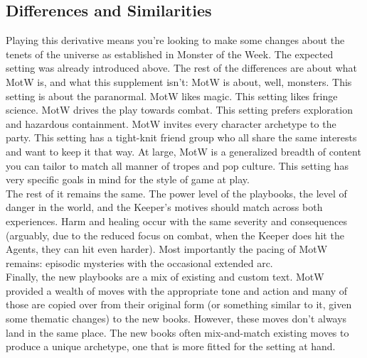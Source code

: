 \documentclass[12pt,oneside,landscape]{memoir}
\begin{document}
\begin{multicols}{2}
\section*{Differences and Similarities}
Playing this derivative means you’re looking to make some changes about the tenets of the universe as established in Monster of the Week.  The expected setting was already introduced above.  The rest of the differences are about what MotW is, and what this supplement isn’t:  MotW is about, well, monsters.  This setting is about the paranormal.  MotW likes magic.  This setting likes fringe science.  MotW drives the play towards combat.  This setting prefers exploration and hazardous containment.  MotW invites every character archetype to the party.  This setting has a tight-knit friend group who all share the same interests and want to keep it that way.  At large, MotW is a generalized breadth of content you can tailor to match all manner of tropes and pop culture.  This setting has very specific goals in mind for the style of game at play.
\\[4mm]
The rest of it remains the same.  The power level of the playbooks, the level of danger in the world, and the Keeper’s motives should match across both experiences.  Harm and healing occur with the same severity and consequences (arguably, due to the reduced focus on combat, when the Keeper does hit the Agents, they can hit even harder).  Most importantly the pacing of MotW remains: episodic mysteries with the occasional extended arc.
\\[4mm]
Finally, the new playbooks are a mix of existing and custom text.  MotW provided a wealth of moves with the appropriate tone and action and many of those are copied over from their original form (or something similar to it, given some thematic changes) to the new books.  However, these moves don’t always land in the same place.  The new books often mix-and-match existing moves to produce a unique archetype, one that is more fitted for the setting at hand.


\end{multicols}
\end{document}
